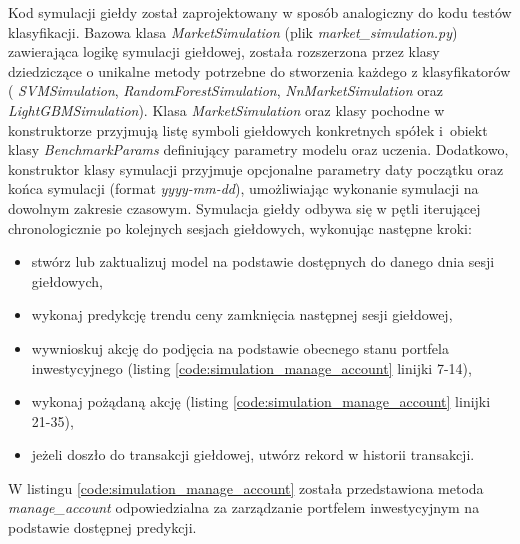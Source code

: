 \documentclass[a4paper, twoside, 11pt, openright]{article}
\begin{document}
Kod symulacji giełdy został zaprojektowany w sposób analogiczny do kodu testów klasyfikacji. Bazowa klasa \textit{MarketSimulation} (plik \textit{market\_simulation.py}) zawierająca logikę symulacji giełdowej, została rozszerzona przez klasy dziedziczące o unikalne metody potrzebne do stworzenia każdego z klasyfikatorów ( \textit{SVMSimulation}, \textit{RandomForestSimulation}, \textit{NnMarketSimulation} oraz \textit{LightGBMSimulation}). Klasa \textit{MarketSimulation} oraz klasy pochodne w konstruktorze przyjmują listę symboli giełdowych konkretnych spółek i~obiekt klasy \textit{BenchmarkParams} definiujący parametry modelu oraz uczenia. Dodatkowo, konstruktor klasy symulacji przyjmuje opcjonalne parametry daty początku oraz końca symulacji (format \textit{yyyy-mm-dd}), umożliwiając wykonanie symulacji na dowolnym zakresie czasowym. Symulacja giełdy odbywa się w pętli iterującej chronologicznie po kolejnych sesjach giełdowych, wykonując następne kroki:
\begin{itemize}
\item stwórz lub zaktualizuj model na podstawie dostępnych do danego dnia sesji giełdowych,
\item wykonaj predykcję trendu ceny zamknięcia następnej sesji giełdowej,
\item wywnioskuj akcję do podjęcia na podstawie obecnego stanu portfela inwestycyjnego (listing  \ref{code:simulation_manage_account} linijki 7-14),
\item wykonaj pożądaną akcję (listing  \ref{code:simulation_manage_account} linijki 21-35),
\item jeżeli doszło do transakcji giełdowej, utwórz rekord w historii transakcji.
\end{itemize}

 W listingu \ref{code:simulation_manage_account} została przedstawiona metoda \textit{manage\_account} odpowiedzialna za zarządzanie portfelem inwestycyjnym na podstawie dostępnej predykcji.
\end{document}
